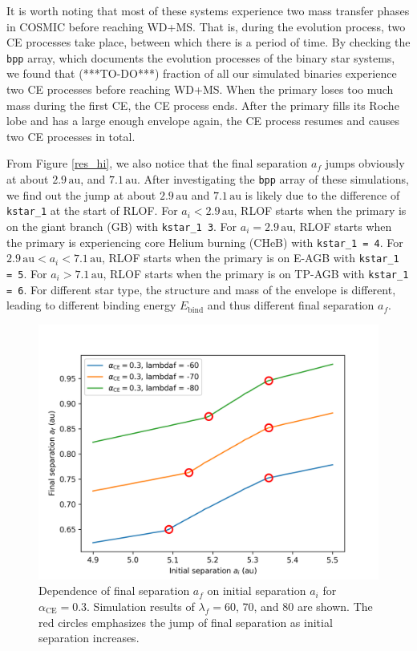 \documentclass[linenumbers]{aastex631}
\newcommand{\alphace}{\alpha_{\mathrm{CE}}}
\newcommand{\Ebind}{E_{\mathrm{bind}}}
\newcommand{\au}{\, \mathrm{au}}
\begin{document}
It is worth noting that most of these systems experience two mass transfer phases in COSMIC before reaching WD+MS. That is, during the evolution process, two CE processes take place, between which there is a period of time. By checking the \verb|bpp| array, which documents the evolution processes of the binary star systems, we found that (***TO-DO***) fraction of all our simulated binaries experience two CE processes before reaching WD+MS. When the primary loses too much mass during the first CE, the CE process ends. After the primary fills its Roche lobe and has a large enough envelope again, the CE process resumes and causes two CE processes in total.

From Figure \ref{res_hi}, we also notice that the final separation $a_f$ jumps obviously at about $2.9 \au$, and $7.1 \au$. After investigating the \verb|bpp| array of these simulations, we find out the jump at about $2.9 \au$ and $7.1 \au$ is likely due to the difference of \verb|kstar_1| at the start of RLOF. For $a_i < 2.9 \au$, RLOF starts when the primary is on the giant branch (GB) with \verb|kstar_1 3|. For $a_i = 2.9 \au$, RLOF starts when the primary is experiencing core Helium burning (CHeB) with \verb|kstar_1 = 4|. For $2.9 \au < a_i < 7.1 \au$, RLOF starts when the primary is on E-AGB with \verb|kstar_1 = 5|. For $a_i > 7.1 \au$, RLOF starts when the primary is on TP-AGB with \verb|kstar_1 = 6|. For different star type, the structure and mass of the envelope is different, leading to different binding energy $\Ebind$ and thus different final separation $a_f$.

\begin{figure}
	\centering
	\includegraphics[width = 0.5\linewidth]{fig/jump-zoom.png}
	\caption{Dependence of final separation $a_f$ on initial separation $a_i$ for $\alphace = 0.3$. Simulation results of $\lambda_f = 60$, $70$, and $80$ are shown. The red circles emphasizes the jump of final separation as initial separation increases.}
	\label{jump-zoom}
\end{figure}
\end{document}
